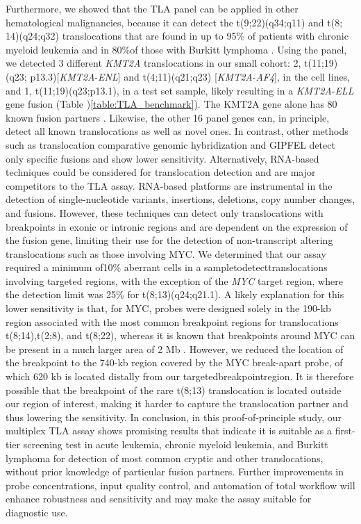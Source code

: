 Furthermore, we showed that the TLA panel can be applied in other hematological malignancies, because it can detect the t(9;22)(q34;q11) and t(8; 14)(q24;q32) translocations that are found in up to 95\% of patients with chronic myeloid leukemia and in 80\%of those with Burkitt lymphoma \cite{Faderl_1999,Ferry_2006}. 
Using the panel, we detected 3 different \textsl{KMT2A} translocations in our small cohort: 2, t(11;19)(q23; p13.3)[\textsl{KMT2A}-\textsl{ENL}] and t(4;11)(q21;q23) [\textsl{KMT2A}-\textsl{AF4}], in the cell lines, and 1, t(11;19)(q23;p13.1), in a test set sample, likely resulting in a \textsl{KMT2A}-\textsl{ELL} gene fusion (Table )\ref{table:TLA_benchmark}).
The KMT2A gene alone has 80 known fusion partners \cite{Meyer_2013,Winters_2017}. 
Likewise, the other 16 panel genes can, in principle, detect all known translocations as well as novel ones. 
In contrast, other methods such as translocation comparative genomic hybridization\cite{Greisman_2011} and GIPFEL\cite{Fueller_2014} detect only specific fusions and show lower sensitivity. 
Alternatively, RNA-based techniques could be considered for translocation detection \cite{Lilljebjorn_2013, Torkildsen_2015, Scolnick_2015, Levin_2009, Zheng_2014} and are major competitors to the TLA assay. 
RNA-based platforms are instrumental in the detection of single-nucleotide variants, insertions, deletions, copy number changes, and fusions\cite{Zheng_2014}.
However, these techniques can detect only translocations with breakpoints in exonic or intronic regions and are dependent on the expression of the fusion gene, limiting their use for the detection of non-transcript altering translocations such as those involving MYC. 
We determined that our assay required a minimum of10\% aberrant cells in a sampletodetecttranslocations involving targeted regions, with the exception of the \textsl{MYC} target region, where the detection limit was 25\% for t(8;13)(q24;q21.1). 
A likely explanation for this lower sensitivity is that, for MYC, probes were designed solely in the 190-kb region associated with the most common breakpoint regions for translocations t(8;14),t(2;8), and t(8;22), whereas it is known that breakpoints around MYC can be present in a much larger area of 2 Mb \cite{van_den_Berg_2017}. 
However, we reduced the location of the breakpoint to the 740-kb region covered by the MYC break-apart probe, of which 620 kb is located distally from our targetedbreakpointregion.
It is therefore possible that the breakpoint of the rare t(8;13) translocation is located outside our region of interest, making it harder to capture the translocation partner and thus lowering the sensitivity.
In conclusion, in this proof-of-principle study, our multiplex TLA assay shows promising results that indicate it is suitable as a first-tier screening test in acute leukemia, chronic myeloid leukemia, and Burkitt lymphoma for detection of most common cryptic and other translocations, without prior knowledge of particular fusion partners.
Further improvements in probe concentrations, input quality control, and automation of total workflow will enhance robustness and sensitivity and may make the assay suitable for diagnostic use.



